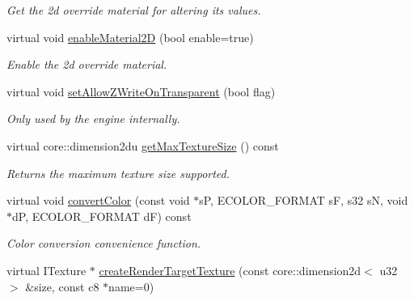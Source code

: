 \begin{DoxyCompactItemize}
\begin{DoxyCompactList}\small\item\em Get the 2d override material for altering its values. \end{DoxyCompactList}\item 
\hypertarget{classirr_1_1video_1_1_c_null_driver_ac549078e976e651b60abf23e076bf232}{virtual void \hyperlink{classirr_1_1video_1_1_c_null_driver_ac549078e976e651b60abf23e076bf232}{enable\-Material2\-D} (bool enable=true)}\label{classirr_1_1video_1_1_c_null_driver_ac549078e976e651b60abf23e076bf232}

\begin{DoxyCompactList}\small\item\em Enable the 2d override material. \end{DoxyCompactList}\item 
\hypertarget{classirr_1_1video_1_1_c_null_driver_a24a00242658415206bab761d2dc87a94}{virtual void \hyperlink{classirr_1_1video_1_1_c_null_driver_a24a00242658415206bab761d2dc87a94}{set\-Allow\-Z\-Write\-On\-Transparent} (bool flag)}\label{classirr_1_1video_1_1_c_null_driver_a24a00242658415206bab761d2dc87a94}

\begin{DoxyCompactList}\small\item\em Only used by the engine internally. \end{DoxyCompactList}\item 
\hypertarget{classirr_1_1video_1_1_c_null_driver_a791fd2064af269df3d75594ce265b204}{virtual core\-::dimension2du \hyperlink{classirr_1_1video_1_1_c_null_driver_a791fd2064af269df3d75594ce265b204}{get\-Max\-Texture\-Size} () const }\label{classirr_1_1video_1_1_c_null_driver_a791fd2064af269df3d75594ce265b204}

\begin{DoxyCompactList}\small\item\em Returns the maximum texture size supported. \end{DoxyCompactList}\item 
virtual void \hyperlink{classirr_1_1video_1_1_c_null_driver_a760f3572e93796ab6115bb3de3232dee}{convert\-Color} (const void $\ast$s\-P, E\-C\-O\-L\-O\-R\-\_\-\-F\-O\-R\-M\-A\-T s\-F, s32 s\-N, void $\ast$d\-P, E\-C\-O\-L\-O\-R\-\_\-\-F\-O\-R\-M\-A\-T d\-F) const 
\begin{DoxyCompactList}\small\item\em Color conversion convenience function. \end{DoxyCompactList}\item 
\hypertarget{classirr_1_1video_1_1_c_null_driver_a9b0e1f8e5fcb2451bb42daba5f2467fd}{virtual I\-Texture $\ast$ \hyperlink{classirr_1_1video_1_1_c_null_driver_a9b0e1f8e5fcb2451bb42daba5f2467fd}{create\-Render\-Target\-Texture} (const core\-::dimension2d$<$ u32 $>$ \&size, const c8 $\ast$name=0)}\label{classirr_1_1video_1_1_c_null_driver_a9b0e1f8e5fcb2451bb42daba5f2467fd}


\end{DoxyCompactItemize}

